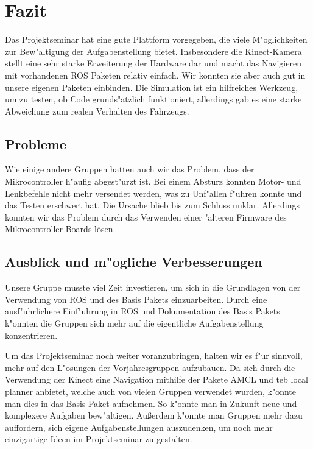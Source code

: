 \section{Fazit}

Das Projektseminar hat eine gute Plattform vorgegeben, die viele M"oglichkeiten zur Bew"altigung der Aufgabenstellung 
bietet. Insbesondere die Kinect-Kamera stellt eine sehr
starke Erweiterung der Hardware dar und macht das Navigieren mit vorhandenen ROS Paketen relativ einfach.
Wir konnten sie aber auch gut in unsere eigenen Paketen einbinden. Die Simulation ist ein hilfreiches Werkzeug, um zu testen, ob Code grunds"atzlich funktioniert, allerdings gab es eine starke Abweichung zum realen Verhalten des Fahrzeugs.		

 

\subsection{Probleme}

Wie einige andere Gruppen hatten auch wir das Problem, dass der Mikrocontroller h"aufig abgest"urzt ist. Bei einem Absturz konnten Motor- und Lenkbefehle nicht mehr versendet werden, was zu Unf"allen f"uhren konnte und das Testen erschwert hat.
Die Ursache blieb bis zum Schluss unklar. Allerdings konnten wir das Problem durch das Verwenden einer "alteren Firmware des Mikrocontroller-Boards lösen.



\subsection{Ausblick und m"ogliche Verbesserungen}

Unsere Gruppe musste viel Zeit investieren, um sich in die Grundlagen von der Verwendung von ROS und des Basis Pakets einzuarbeiten. 
Durch eine ausf"uhrlichere Einf"uhrung in ROS und Dokumentation des Basis Pakets k"onnten die Gruppen sich mehr auf die eigentliche Aufgabenstellung
konzentrieren.

Um das Projektseminar noch weiter voranzubringen, halten wir es f"ur sinnvoll, mehr auf den L"osungen der Vorjahresgruppen aufzubauen.
Da sich durch die Verwendung der Kinect eine Navigation mithilfe der Pakete AMCL und teb local planner anbietet, welche auch von vielen Gruppen verwendet wurden,
k"onnte man dies in das Basis Paket aufnehmen. So k"onnte man in Zukunft neue und komplexere Aufgaben bew"altigen.
Au{\ss}erdem k"onnte man Gruppen mehr dazu auffordern, sich eigene Aufgabenstellungen auszudenken, um noch mehr einzigartige Ideen im Projektseminar zu gestalten.
